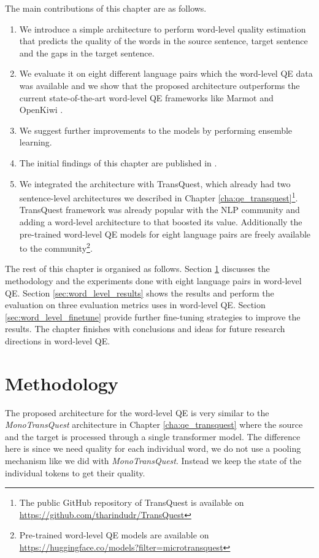 The main contributions of this chapter are as follows.
\begin{enumerate}
  \item We introduce a simple architecture to perform word-level quality estimation that predicts the quality of the words in the source sentence, target sentence and the gaps in the target sentence.
  
  \item We evaluate it on eight different language pairs which the word-level QE data was available and we show that the proposed architecture outperforms the current state-of-the-art word-level QE frameworks like Marmot \cite{logacheva-etal-2016-marmot} and OpenKiwi \cite{kepler-etal-2019-openkiwi}.
  
  \item We suggest further improvements to the models by performing ensemble learning.
  
  \item The initial findings of this chapter are published in \citet{ranasinghe-etal-2021-exploratory}. 
  
  \item We integrated the architecture with TransQuest, which already had two sentence-level architectures we described in Chapter \ref{cha:qe_transquest}\footnote{The public GitHub repository of TransQuest is available on \url{https://github.com/tharindudr/TransQuest}}. TransQuest framework was already popular with the NLP community and adding a word-level architecture to that boosted its value. Additionally the pre-trained word-level QE models for eight language pairs are freely available to the community\footnote{Pre-trained word-level QE models are available on \url{https://huggingface.co/models?filter=microtransquest}}. 
  	
\end{enumerate}

The rest of this chapter is organised as follows. Section \ref{sec:word_level_method} discusses the methodology and the experiments done with eight language pairs in word-level QE.  Section \ref{sec:word_level_results} shows the results and perform the evaluation on three evaluation metrics uses in word-level QE. Section \ref{sec:word_level_finetune} provide further fine-tuning strategies to improve the results. The chapter finishes with conclusions and ideas for future research directions in word-level QE.

\section{Methodology}
\label{sec:word_level_method}
The proposed architecture for the word-level QE is very similar to the \textit{MonoTransQuest} architecture in Chapter \ref{cha:qe_transquest} where the source and the target is processed through a single transformer model. The difference here is since we need quality for each individual word, we do not use a pooling mechanism like we did with \textit{MonoTransQuest}. Instead we keep the state of the individual tokens to get their quality.

